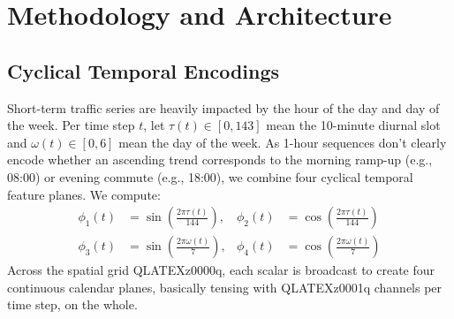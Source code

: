 \documentclass[conference]{IEEEtran}
\begin{document}
\section{Methodology and Architecture}

\subsection{Cyclical Temporal Encodings}
Short-term traffic series are heavily impacted by the hour of the day and day of the week. Per time step $t$, let $\tau(t) \in [0, 143]$ mean the 10-minute diurnal slot and $\omega(t) \in [0, 6]$ mean the day of the week. As 1-hour sequences don't clearly encode whether an ascending trend corresponds to the morning ramp-up (e.g., 08:00) or evening commute (e.g., 18:00), we combine four cyclical temporal feature planes. We compute:
\begin{align}
    \phi_{1}(t) &= \sin\left(\frac{2\pi \tau(t)}{144}\right), & \phi_{2}(t) &= \cos\left(\frac{2\pi \tau(t)}{144}\right) \\
    \phi_{3}(t) &= \sin\left(\frac{2\pi \omega(t)}{7}\right), & \phi_{4}(t) &= \cos\left(\frac{2\pi \omega(t)}{7}\right)
\end{align}
Across the spatial grid QLATEXz0000q, each scalar is broadcast to create four continuous calendar planes, basically tensing with QLATEXz0001q channels per time step, on the whole.
\end{document}
